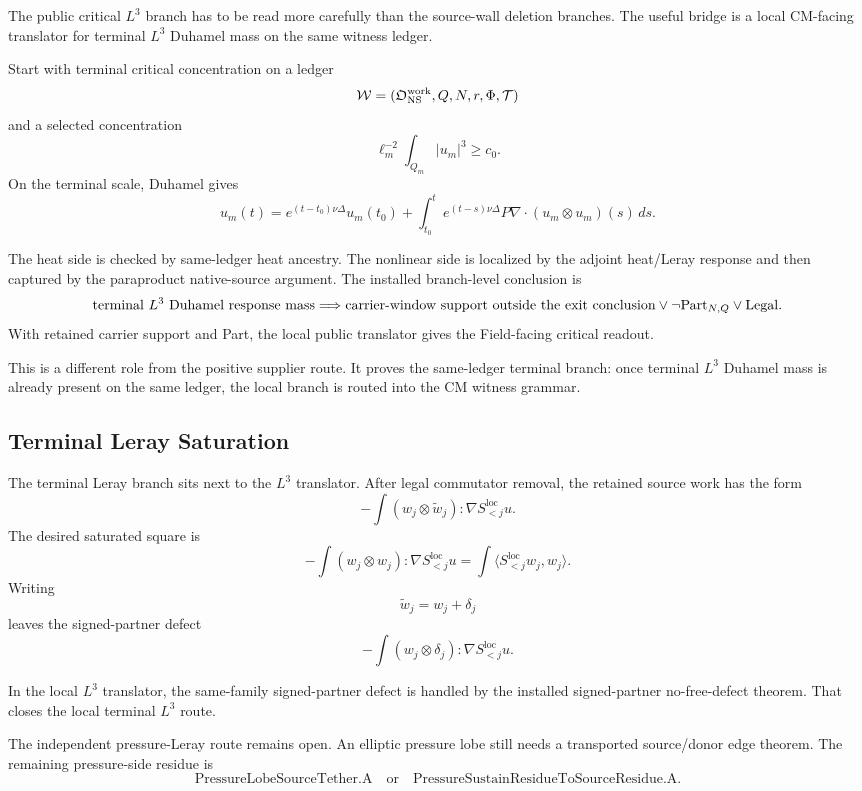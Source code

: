 The public critical \(L^3\) branch has to be read more carefully than the
source-wall deletion branches.
The useful bridge is a local CM-facing translator for terminal \(L^3\) Duhamel
mass on the same witness ledger.

Start with terminal critical concentration on a ledger
\[
  \mathcal W=(\mathfrak O_{\mathrm{NS}}^{\mathrm{work}},Q,N,r,\Phi,\mathcal T)
\]
and a selected concentration
\[
  \ell_m^{-2}\int_{Q_m}|u_m|^3\ge c_0 .
\]
On the terminal scale, Duhamel gives
\[
  u_m(t)
  =
  e^{(t-t_0)\nu\Delta}u_m(t_0)
  +
  \int_{t_0}^{t}
  e^{(t-s)\nu\Delta}
  P\nabla\cdot(u_m\otimes u_m)(s)\,ds .
\]

The heat side is checked by same-ledger heat ancestry.
The nonlinear side is localized by the adjoint heat/Leray response and then
captured by the paraproduct native-source argument.
The installed branch-level conclusion is
\[
  \text{terminal }L^3\text{ Duhamel response mass}
  \Longrightarrow
  \text{carrier-window support outside the exit conclusion}
  \vee
  \neg\mathrm{Part}_{N,Q}
  \vee
  \mathrm{Legal} .
\]
With retained carrier support and Part, the local public translator gives the Field-facing
critical readout.

This is a different role from the positive supplier route.
It proves the same-ledger terminal branch:
once terminal \(L^3\) Duhamel mass is already present on the same ledger, the
local branch is routed into the CM witness grammar.

\subsection{Terminal Leray Saturation}

The terminal Leray branch sits next to the \(L^3\) translator.
After legal commutator removal, the retained source work has the form
\[
  -\int (w_j\otimes\widetilde w_j):\nabla S^{\mathrm{loc}}_{<j}u .
\]
The desired saturated square is
\[
  -\int (w_j\otimes w_j):\nabla S^{\mathrm{loc}}_{<j}u
  =
  \int\langle S^{\mathrm{loc}}_{<j}w_j,w_j\rangle .
\]
Writing
\[
  \widetilde w_j=w_j+\delta_j
\]
leaves the signed-partner defect
\[
  -\int (w_j\otimes\delta_j):\nabla S^{\mathrm{loc}}_{<j}u .
\]

In the local \(L^3\) translator, the same-family signed-partner defect is
handled by the installed signed-partner no-free-defect theorem.
That closes the local terminal \(L^3\) route.

The independent pressure-Leray route remains open.
An elliptic pressure lobe still needs a transported source/donor edge theorem.
The remaining pressure-side residue is
\[
  \text{PressureLobeSourceTether.A}
  \quad\text{or}\quad
  \text{PressureSustainResidueToSourceResidue.A}.
\]

